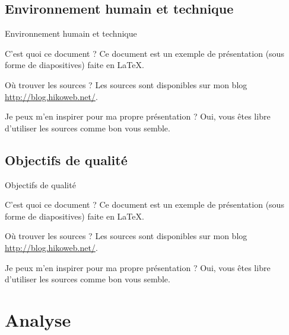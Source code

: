 \documentclass[utf8,compress]{beamer}
\begin{document}
\subsection{Environnement humain et technique}
\begin{frame}{Environnement humain et technique}
\begin{block}{C'est quoi ce document ?}
    Ce document est un exemple de présentation (sous forme de diapositives) faite en LaTeX.
\end{block}
\begin{block}{Où trouver les sources ?}
    Les sources sont disponibles sur mon blog \url{http://blog.hikoweb.net/}.
\end{block}
\begin{block}{Je peux m'en inspirer pour ma propre présentation ?}
    Oui, vous êtes libre d'utiliser les sources comme bon vous semble.
\end{block}
\end{frame}
\subsection{Objectifs de qualité}
\begin{frame}{Objectifs de qualité}
\begin{block}{C'est quoi ce document ?}
    Ce document est un exemple de présentation (sous forme de diapositives) faite en LaTeX.
\end{block}
\begin{block}{Où trouver les sources ?}
    Les sources sont disponibles sur mon blog \url{http://blog.hikoweb.net/}.
\end{block}
\begin{block}{Je peux m'en inspirer pour ma propre présentation ?}
    Oui, vous êtes libre d'utiliser les sources comme bon vous semble.
\end{block}
\end{frame}


\section{Analyse}
\end{document}
